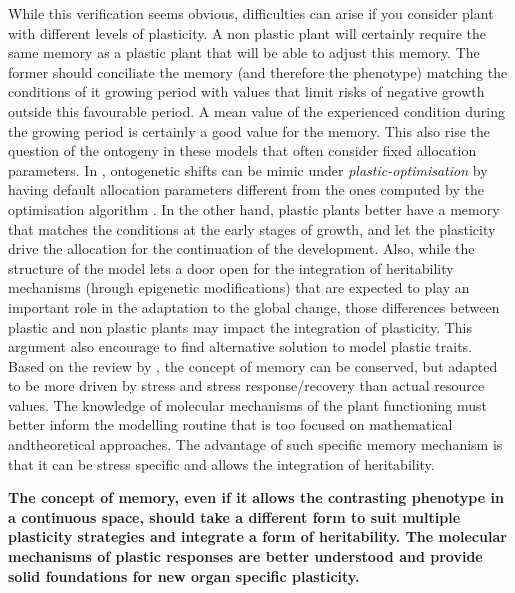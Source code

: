 While this verification seems obvious, difficulties can arise if you consider plant with different levels of plasticity. A non plastic plant will certainly require the same memory as a plastic plant that will be able to adjust this memory. The former should conciliate the memory (and therefore the phenotype) matching the conditions of it growing period with values that limit risks of negative growth outside this favourable period. A mean value of the experienced condition during the growing period is certainly a good value for the memory. This also rise the question of the ontogeny in these models that often consider fixed allocation parameters. In \model , ontogenetic shifts can be mimic under \textit{plastic-optimisation} by having default allocation parameters different from the ones computed by the optimisation algorithm . In the other hand, plastic plants better have a memory that matches the conditions at the early stages of growth, and let the plasticity drive the allocation for the continuation of the development. Also, while the structure of the model lets a door open for the integration of heritability mechanisms (hrough epigenetic modifications) that are expected to play an important role in the adaptation to the global change, those differences between plastic and non plastic plants may impact the integration of plasticity. This argument also encourage to find alternative solution to model plastic traits. Based on the review by \cite{crisp_reconsidering_2016}, the concept of memory can be conserved, but adapted to be more driven by stress and stress response/recovery than actual resource values. The knowledge of molecular mechanisms of the plant functioning must better inform the modelling routine that is too focused on mathematical andtheoretical approaches. The advantage of such specific memory mechanism is that it can be stress specific  and allows the integration of heritability.

\textbf{The concept of memory, even if it allows the contrasting phenotype in a continuous space, should take a different form to suit multiple plasticity strategies and integrate a form of heritability. The molecular mechanisms of plastic responses are better understood and provide solid foundations for new organ specific plasticity.}

